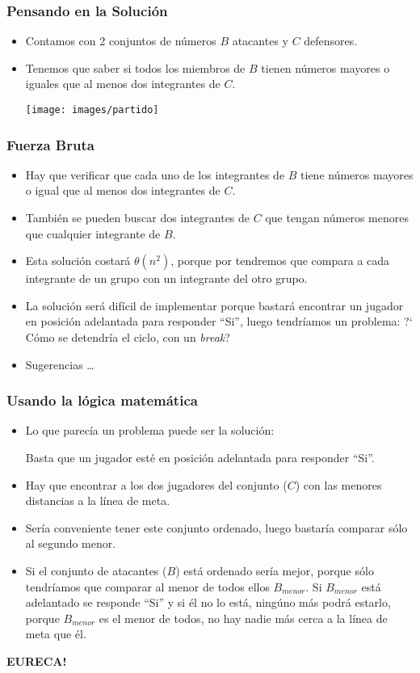 \documentclass{beamer}
\begin{document}
\begin{frame}
 \frametitle{Pensando en la Solución}
 \begin{itemize}
  \item Contamos con 2 conjuntos de números $B$ atacantes y $C$ defensores.
  \item Tenemos que saber si todos los miembros de $B$ tienen números mayores o iguales que al menos dos integrantes de $C$.
  \begin{center}
   \texttt{[image: images/partido]}
  \end{center}
 \end{itemize}

\end{frame}

\begin{frame}
 \frametitle{Fuerza Bruta}
 \begin{itemize}
  \item Hay que verificar que cada uno de los integrantes de $B$ tiene números mayores o igual que al menos dos integrantes de $C$.
  \item También se pueden buscar dos integrantes de $C$ que tengan números menores que cualquier integrante de $B$.
  \item Esta solución costará $\theta(n^2)$, porque por tendremos que compara a cada integrante de un grupo con un integrante del otro grupo.
  \item La solución será difícil de implementar porque bastará encontrar un jugador en posición adelantada para responder ``Si'', luego tendríamos un problema: ?` Cómo se detendría el ciclo, con un \emph{break}?
  \item Sugerencias \ldots
 \end{itemize}
\end{frame}

\begin{frame}
 \frametitle{Usando la lógica matemática}
 \begin{itemize}
  \item Lo que parecía un problema puede ser la solución: 
  
  Basta que un jugador esté en posición adelantada para responder ``Si''.
  \item Hay que encontrar a los dos jugadores del conjunto ($C$) con las menores distancias a la línea de meta.
  \item Sería conveniente tener este conjunto ordenado, luego bastaría comparar sólo al segundo menor. 
  \item Si el conjunto de atacantes ($B$) está ordenado sería mejor, porque sólo tendríamos que comparar al menor de todos ellos $B_{menor}$. Si $B_{menor}$ está adelantado se responde ``Si'' y si él no lo está, ningúno más podrá estarlo, porque $B_{menor}$ es el menor de todos, no hay nadie más cerca a la línea de meta que él.
 \end{itemize}
 \begin{flushright}
\textbf{EURECA!}                 \end{flushright}
\end{frame}
\end{document}
